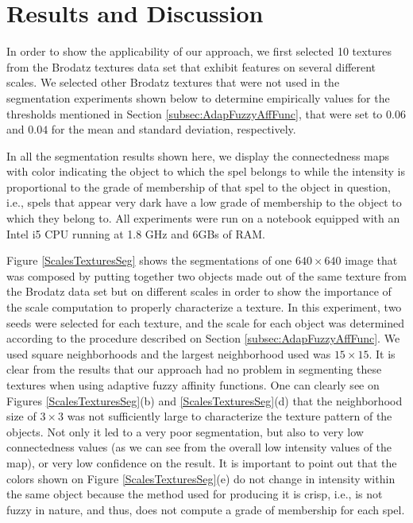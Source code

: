 \documentclass[10pt,twocolumn,letterpaper]{article}
\begin{document}
\section{Results and Discussion}\label{sec:Discussion}

In order to show the applicability of our approach, we first selected 10 textures from the Brodatz textures data set \cite{BROD66a} that exhibit features on several different scales. We selected other Brodatz textures that were not used in the segmentation experiments shown below to determine empirically values for the thresholds mentioned in Section \ref{subsec:AdapFuzzyAffFunc}, that were set to $0.06$ and $0.04$ for the mean and standard deviation, respectively.

In all the segmentation results shown here, we display the connectedness maps with color indicating the object to which the spel belongs to while the intensity is proportional to the grade of membership of that spel to the object in question, i.e., spels that appear very dark have a low grade of membership to the object to which they belong to. All experiments were run on a notebook equipped with an Intel i5 CPU running at 1.8 GHz and 6GBs of RAM.

Figure \ref{ScalesTexturesSeg} shows the segmentations of one $640 \times 640$ image that was composed by putting together two objects made out of the same texture from the Brodatz data set but on different scales in order to show the importance of the scale computation to properly characterize a texture. In this experiment, two seeds were selected for each texture, and the scale for each object was determined according to the procedure described on Section \ref{subsec:AdapFuzzyAffFunc}. We used square neighborhoods and the largest neighborhood used was $15 \times 15$. It is clear from the results that our approach had no problem in segmenting these textures when using adaptive fuzzy affinity functions. One can clearly see on Figures \ref{ScalesTexturesSeg}(b) and \ref{ScalesTexturesSeg}(d) that the neighborhood size of $3 \times 3$ was not sufficiently large to characterize the texture pattern of the objects. Not only it led to a very poor segmentation, but also to very low connectedness values (as we can see from the overall low intensity values of the map), or very low confidence on the result. It is important to point out that the colors shown on Figure \ref{ScalesTexturesSeg}(e) do not change in intensity within the same object because the method used for producing it is crisp, i.e., is not fuzzy in nature, and thus, does not compute a grade of membership for each spel.
\end{document}
